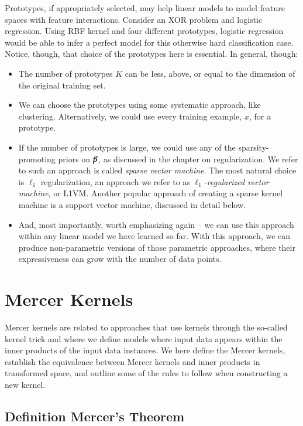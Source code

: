 \begin{refsection}
Prototypes, if appropriately selected, may help linear models to model feature spaces with feature interactions. Consider an XOR problem and logistic regression. Using RBF kernel and four different prototypes, logistic regression would be able to infer a perfect model for this otherwise hard classification case. Notice, though, that choice of the prototypes here is essential. In general, though:
\begin{itemize}
\item The number of prototypes $K$ can be less, above, or equal to the dimension of the original training set.
\item We can choose the prototypes using some systematic approach, like clustering. Alternatively, we could use every training example, $x$, for a prototype.
\item If the number of prototypes is large, we could use any of the sparsity-promoting priors on $\boldsymbol{\beta}$, as discussed in the chapter on regularization. We refer to such an approach is called {\em sparse vector machine}. The most natural choice is $\ell_1$ regularization, an approach we refer to as {\em $\ell_1$-regularized vector machine}, or L1VM. Another popular approach of creating a sparse kernel machine is a support vector machine, discussed in detail below.
\item And, most importantly, worth emphasizing again -- we can use this approach within any linear model we have learned so far. With this approach, we can produce non-parametric versions of those parametric approaches, where their expressiveness can grow with the number of data points.
\end{itemize}


\section{Mercer Kernels}

Mercer kernels are related to approaches that use kernels through the so-called kernel trick and where we define models where input data appears within the inner products of the input data instances. We here define the Mercer kernels, establish the equivalence between Mercer kernels and inner products in transformed space, and outline some of the rules to follow when constructing a new kernel.

\subsection*{Definition Mercer's Theorem}


\end{refsection}
